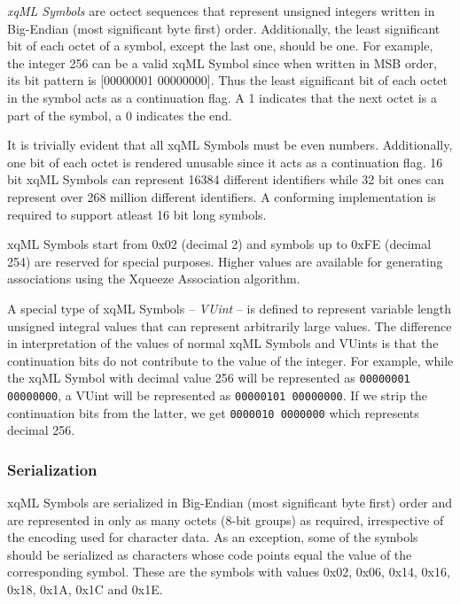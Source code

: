 
\textit{xqML Symbols} are octect sequences that represent unsigned
integers written in Big-Endian (most significant byte first)
order. Additionally, the least significant bit of each octet of a
symbol, except the last one, should be one. For example, the integer
256 can be a valid xqML Symbol since when written in MSB order, its
bit pattern is [00000001 00000000]. Thus the least significant bit of
each octet in the symbol acts as a continuation flag. A 1 indicates
that the next octet is a part of the symbol, a 0 indicates the end.

It is trivially evident that all xqML Symbols must be even
numbers. Additionally, one bit of each octet is rendered unusable
since it acts as a continuation flag. 16 bit xqML Symbols can
represent 16384 different identifiers while 32 bit ones can represent
over 268 million different identifiers. A conforming implementation is
required to support atleast 16 bit long symbols.

xqML Symbols start from 0x02 (decimal 2) and symbols up to 0xFE
(decimal 254) are reserved for special purposes. Higher values are
available for generating associations using the Xqueeze Association
algorithm.

A special type of xqML Symbols -- {\it VUint} -- is defined to
represent variable length unsigned integral values that can
represent arbitrarily large values. The difference in interpretation
of the values of normal xqML Symbols and VUints is that the
continuation bits do not contribute to the value of the integer. For
example, while the xqML Symbol with decimal value 256 will be
represented as \verb|00000001 00000000|, a VUint will be represented
as \verb|00000101 00000000|. If we strip the continuation bits from
the latter, we get \verb|0000010 0000000| which represents decimal
256.

\subsubsection{Serialization}

xqML Symbols are serialized in Big-Endian (most significant byte
first) order and are represented in only as many octets (8-bit groups)
as required, irrespective of the encoding used for character
data. As an exception, some of the symbols should be serialized as
characters whose code points equal the value of the corresponding
symbol. These are the symbols with values 0x02, 0x06, 0x14, 0x16,
0x18, 0x1A, 0x1C and 0x1E.
 
